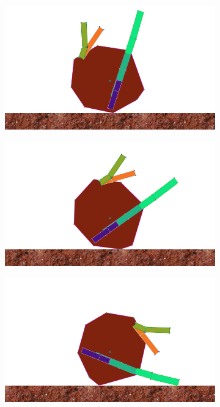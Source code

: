 \begin{figure}[H]
\begin{subfigure}[b]{0.3\textwidth}
          \caption{\label{fig:roll_3}}
        \end{subfigure}

        \begin{subfigure}[b]{0.3\textwidth}
          \includegraphics[width=\linewidth,center]{graphics/simulation-discussion/roll_4}
          \caption{\label{fig:roll_4}}
        \end{subfigure}
        \hspace{\fill}
        \begin{subfigure}[b]{0.3\textwidth}
          \includegraphics[width=\linewidth,center]{graphics/simulation-discussion/roll_5}
          \caption{\label{fig:roll_5}}
        \end{subfigure}
        \hspace{\fill}
        \begin{subfigure}[b]{0.3\textwidth}
          \includegraphics[width=\linewidth,center]{graphics/simulation-discussion/roll_6}

\end{subfigure}
\end{figure}
